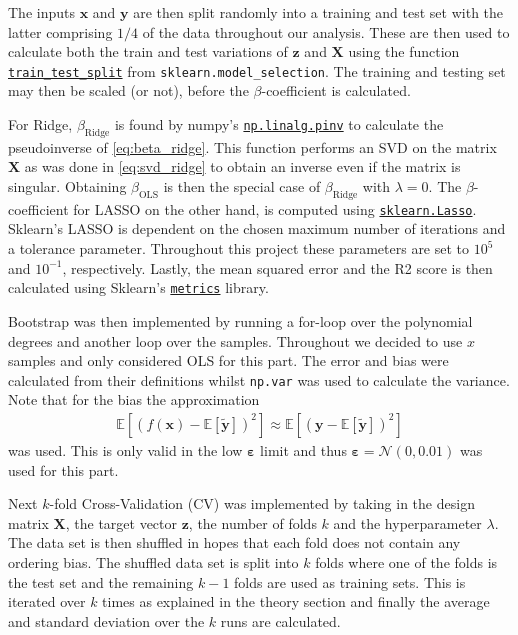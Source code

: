 \documentclass[%
reprint,
amsmath,amssymb,
aps,
pra,
]{revtex4-2}
\begin{document}
The inputs $\bm x$ and $\bm y$ are then split randomly into a training and test set with the latter comprising \(1/4\) of the data throughout our analysis. These are then used to calculate both the train and test variations of $\bm z$ and $\bm X$ using the function \href{https://scikit-learn.org/stable/modules/generated/sklearn.model_selection.train_test_split.html}{\texttt{train\_test\_split}} from \texttt{sklearn.model\_selection}. The training and testing set may then be scaled (or not), before the \(\beta\)-coefficient is calculated. 

For Ridge, \(\beta_{\text{Ridge}}\) is found by numpy's \href{https://numpy.org/doc/2.0/reference/generated/numpy.linalg.pinv.html}{\texttt{np.linalg.pinv}} to calculate the pseudoinverse of \eqref{eq:beta_ridge}. This function performs an SVD on the matrix $\bm X$ as was done in \eqref{eq:svd_ridge} to obtain an inverse even if the matrix is singular. Obtaining \(\beta_{\text{OLS}}\) is then the special case of \(\beta_{\text{Ridge}}\) with \(\lambda=0\). The \(\beta\)-coefficient for LASSO on the other hand, is computed using \href{https://scikit-learn.org/stable/modules/generated/sklearn.linear_model.Lasso.html}{\texttt{sklearn.Lasso}}. 
Sklearn's LASSO is dependent on the chosen maximum number of iterations and a tolerance parameter. Throughout this project these parameters are set to \(10^5\) and \(10^{-1}\), respectively. Lastly, the mean squared error and the R2 score is then calculated using Sklearn's \href{https://scikit-learn.org/stable/modules/model_evaluation.html}{\texttt{metrics}} library.

Bootstrap was then implemented by running a for-loop over the polynomial degrees and another loop over the samples. Throughout we decided to use $x$ samples and only considered OLS for this part. The error and bias were calculated from their definitions whilst \texttt{np.var} was used to calculate the variance. Note that for the bias the approximation
\begin{align}
	\mathbb E[(f(\bm x)-\mathbb E[\tilde{\bm{y}}])^2]\approx \mathbb E[(\bm y-\mathbb E[\tilde{\bm{y}}])^2]
\end{align}
was used. This is only valid in the low $\bm \varepsilon$ limit and thus $\bm\varepsilon=\mathcal{N}(0, 0.01)$ was used for this part.

Next $k$-fold Cross-Validation (CV) was implemented by taking in the design matrix $\bm X$, the target vector $\bm z$, the number of folds $k$ and the hyperparameter $\lambda$. The data set is then shuffled in hopes that each fold does not contain any ordering bias. The shuffled data set is split into $k$ folds where one of the folds is the test set and the remaining $k-1$ folds are used as training sets. This is iterated over $k$ times as explained in the theory section and finally the average and standard deviation over the $k$ runs are calculated.
\end{document}

